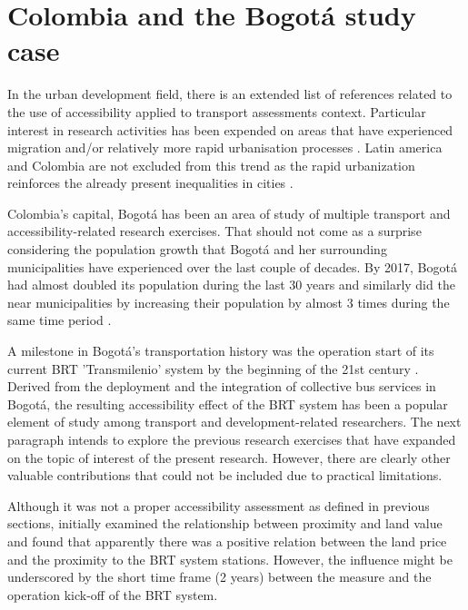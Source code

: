 \documentclass[12pt, a4paper]{report}
\begin{document}
\section{Colombia and the Bogot\'{a} study case}

In the urban development field, there is an extended list of references related to the use of accessibility applied to transport assessments context. Particular interest in research activities has been expended on areas that have experienced migration and/or relatively more rapid urbanisation processes \citep{kojimaIntroductionPopulationMigration1996}. Latin america and Colombia are not excluded from this trend as the rapid urbanization reinforces the already present inequalities in cities \citep{wrightwendelAccessibilityUsabilityGreen2012,tellezUrbanDevelopmentBogota2018}.


Colombia's capital, Bogot\'{a} has been an area of study of multiple transport and accessibility-related research exercises. That should not come as a surprise considering the population growth that Bogot\'{a} and her surrounding municipalities have experienced over the last couple of decades. By 2017, Bogot\'{a} had almost doubled its population during the last 30 years and similarly did the near municipalities by increasing their population by almost 3 times during the same time period \citep{guzmanCityProfileBogota2017}.

A milestone in Bogotá's transportation history was the operation start of its current BRT 'Transmilenio' system by the beginning of the 21st century \citep{rodriguezValueAccessibilityBogota2004}. Derived from the deployment and the integration of collective bus services in Bogotá, the resulting accessibility effect of the BRT system has been a popular element of study among transport and development-related researchers. The next paragraph intends to explore the previous research exercises that have expanded on the topic of interest of the present research. However, there are clearly other valuable contributions that could not be included due to practical limitations.


Although it was not a proper accessibility assessment as defined in previous sections, \cite{rodriguezValueAccessibilityBogota2004} initially examined the relationship between proximity and land value and found that apparently there was a positive relation between the land price and the proximity to the BRT system stations. However, the influence might be underscored by the short time frame (2 years) between the measure and the operation kick-off of the BRT system.
\end{document}
